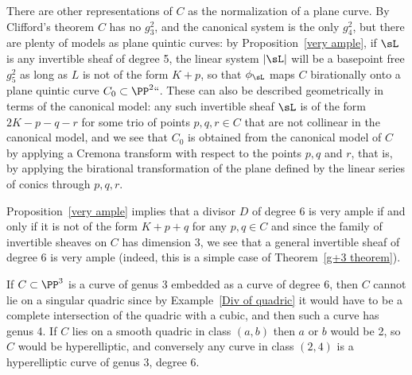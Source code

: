 There are other representations of $C$ as the normalization of a plane
curve. By
Clifford's theorem
%
 $C$ has no $g^2_3$, and the canonical system
is the only $g^2_4$, but there are plenty of models as plane
quintic curves:
by Proposition~\ref{very ample}, if $\sL$ is any invertible sheaf
of degree 5, the linear system $|\sL|$ will be a basepoint free $g^2_5$
as long as $L$ is not of the form $K+p$, so that $\phi_\sL$ maps $C$
birationally
%
onto a
plane quintic curve
%
$C_0 \subset \PP^2` `$. These can
also be described geometrically in terms of the canonical model: any
such invertible sheaf $\sL$ is of the form $2K-p-q-r$ for some trio of
points $p, q, r \in C$ that are not collinear in the
canonical model,
%
and we see  that $C_0$ is obtained from the canonical model of $C$ by
applying a
Cremona transform
%
with respect to the points $p, q$ and $r$,
that is, by applying the birational transformation
of the plane defined by the linear series of conics through $p,q,r$.

Proposition~\ref{very ample} implies that a divisor $D$ of degree 6 is
very ample if and only if it is not of the form $K+p+q$ for any $p, q
\in C$ and since the family of invertible sheaves on $C$ has dimension 3,
we see that a general invertible sheaf of degree 6 is very ample (indeed,
this is a simple case of Theorem~\ref{g+3 theorem}).

If $C\subset \PP^3$ is a curve of genus 3 embedded as a curve of degree
6, then $C$ cannot lie on a singular quadric since by
Example~\ref{Div of quadric} it would
have to be a complete intersection of the quadric with a cubic, and then
such a curve has genus 4. If $C$ lies on a smooth quadric
in class $(a,b)$ then $a$ or $b$ would be 2, so $C$ would be
hyperelliptic, and conversely any curve in class $(2,4)$
is a hyperelliptic curve of genus 3, degree 6.

